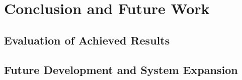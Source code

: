 \clearpage
\section{Conclusion and Future Work}
\subsection{Evaluation of Achieved Results}
\subsection{Future Development and System Expansion}